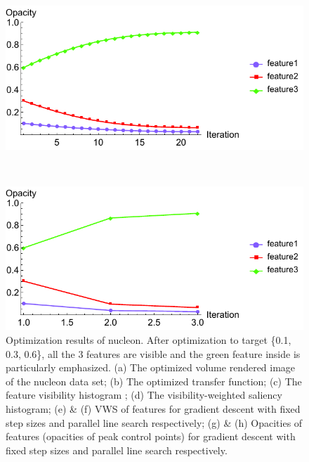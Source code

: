 \begin{figure}
	\begin{minipage}{.49\textwidth}
		\includegraphics[width=1\linewidth]{figures/nucleon_naive_proportional_opacity_fixed}
		\subcaption{}
	\end{minipage}~
	\begin{minipage}{.49\textwidth}
		\includegraphics[width=1\linewidth]{figures/nucleon_naive_proportional_opacity_parallelsearch}
		\subcaption{}
	\end{minipage}
	\caption[Optimization results of nucleon]{Optimization results of nucleon. After optimization to target \{0.1, 0.3, 0.6\}, all the 3 features are visible and the green feature inside is particularly emphasized. (a) The optimized volume rendered image of the nucleon data set; (b) The optimized transfer function; (c) The feature visibility histogram \cite{wang_efficient_2011}; (d) The visibility-weighted saliency histogram; (e) \& (f) VWS of features for gradient descent with fixed step sizes and parallel line search respectively; (g) \& (h) Opacities of features (opacities of peak control points) for gradient descent with fixed step sizes and parallel line search respectively.}
	\label{fig:nucleon_naive_optimized}
\end{figure}

